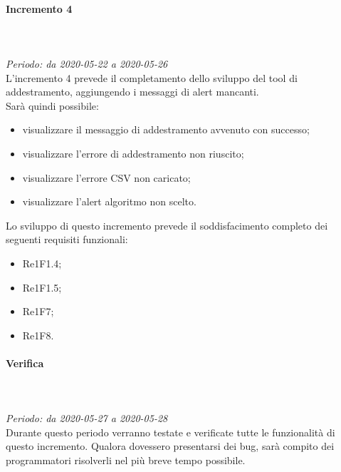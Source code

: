 \paragraph{Incremento 4}\mbox{} \\ \mbox{} \\ 
\textit{Periodo: da 2020-05-22 a 2020-05-26}\\
L’incremento 4 prevede il completamento dello sviluppo del tool di addestramento, aggiungendo i messaggi di alert mancanti.\\
Sarà quindi possibile:
\begin{itemize}
	\item visualizzare il messaggio di addestramento avvenuto con successo;
	\item visualizzare l'errore di addestramento non riuscito;
	\item visualizzare l'errore CSV non caricato;
	\item visualizzare l'alert algoritmo non scelto. 
\end{itemize}
Lo sviluppo di questo incremento prevede il soddisfacimento completo dei seguenti requisiti funzionali:
\begin{itemize}
\item Re1F1.4;
\item Re1F1.5;
\item Re1F7;
\item Re1F8.
\end{itemize}
\paragraph*{Verifica}\mbox{} \\ \mbox{} \\ 
\textit{Periodo: da 2020-05-27 a 2020-05-28}\\
Durante questo periodo verranno testate e verificate tutte le funzionalità di questo incremento. Qualora dovessero presentarsi dei bug, sarà compito dei programmatori risolverli nel più breve tempo possibile.

